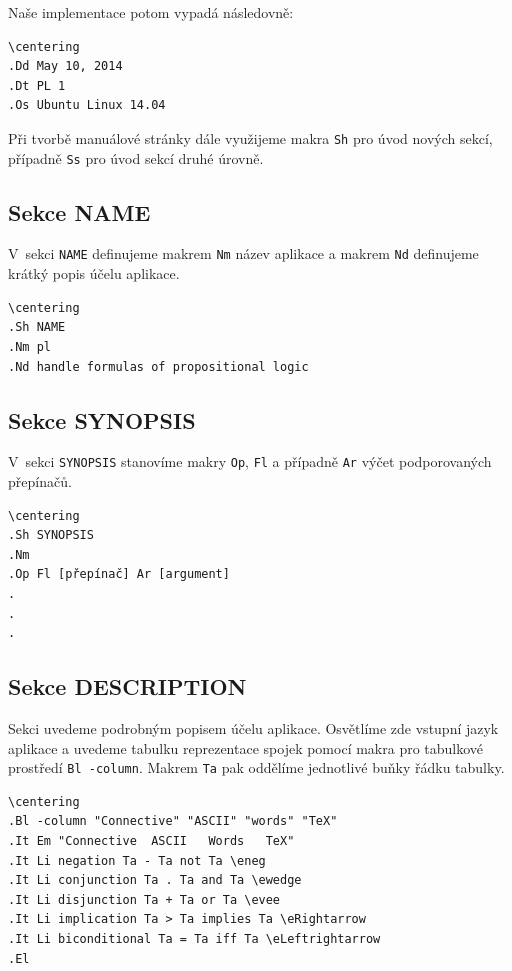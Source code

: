 \documentclass[thesis=B,czech,hidelinks]{thesis}[2012/06/26]
\begin{document}
Naše implementace potom vypadá následovně:

\begin{verbatim}
\centering
.Dd May 10, 2014
.Dt PL 1
.Os Ubuntu Linux 14.04
\end{verbatim}

Při tvorbě manuálové stránky dále využijeme makra \texttt{Sh} pro úvod nových sekcí, případně \texttt{Ss} pro úvod sekcí druhé úrovně.

\subsection{Sekce NAME}

V~sekci \texttt{NAME} definujeme makrem \texttt{Nm} název aplikace a makrem \texttt{Nd} definujeme krátký popis účelu aplikace.

\begin{verbatim}
\centering
.Sh NAME
.Nm pl
.Nd handle formulas of propositional logic
\end{verbatim}

\subsection{Sekce SYNOPSIS}

V~sekci \texttt{SYNOPSIS} stanovíme makry \texttt{Op}, \texttt{Fl} a případně \texttt{Ar} výčet podporovaných přepínačů.

\begin{verbatim}
\centering
.Sh SYNOPSIS
.Nm
.Op Fl [přepínač] Ar [argument]
.
.
.
\end{verbatim}

\subsection{Sekce DESCRIPTION}

Sekci uvedeme podrobným popisem účelu aplikace. Osvětlíme zde vstupní jazyk aplikace a uvedeme tabulku reprezentace spojek pomocí makra pro tabulkové prostředí \texttt{Bl -column}. Makrem \texttt{Ta} pak oddělíme jednotlivé buňky řádku tabulky.

\begin{verbatim}
\centering
.Bl -column "Connective" "ASCII" "words" "TeX"
.It Em "Connective	ASCII	Words	TeX"
.It Li negation Ta - Ta not Ta \eneg
.It Li conjunction Ta . Ta and Ta \ewedge
.It Li disjunction Ta + Ta or Ta \evee
.It Li implication Ta > Ta implies Ta \eRightarrow
.It Li biconditional Ta = Ta iff Ta \eLeftrightarrow
.El
\end{verbatim}
\end{document}
